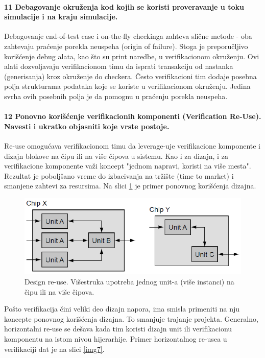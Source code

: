\documentclass[a4paper, 12pt]{article}
\begin{document}
\paragraph{11 Debagovanje okruženja kod kojih se koristi proveravanje u toku simulacije i na kraju simulacije.}
\hfill \break
\indent Debagovanje end-of-test case i on-the-fly checkinga zahteva slične metode - oba zahtevaju praćenje porekla neuspeha (origin of failure). Stoga je preporučljivo korišćenje debug alata, kao što su print naredbe, u verifikacionom okruženju. Ovi alati dozvoljavaju verifikacionom timu da isprati transakciju od nastanka (generisanja) kroz okruženje do checkera. Često verifikacioni tim dodaje posebna polja strukturama podataka koje se koriste u verifikacionom okruženju. Jedina svrha ovih posebnih polja je da pomognu u praćenju porekla neuspeha.
\paragraph{12 Ponovno korišćenje verifikacionih komponenti (Verification Re-Use). Navesti i ukratko objasniti koje vrste postoje.}
\hfill \break
\indent Re-use omogućava verifikacionom timu da leverage-uje verifikacione komponente i dizajn blokove na čipu ili na više čipova u sistemu. Kao i za dizajn, i za verifikacione komponente važi koncept "jednom napravi, koristi na više mesta". Rezultat je poboljšano vreme do izbacivanja na tržište (time to market) i smanjene zahtevi za resursima. Na slici \ref{img6} je primer ponovnog korišćenja dizajna.
\begin{figure}[h!]
\centering
\includegraphics[scale=0.5]{img6.png}
\caption{Design re-use. Višestruka upotreba jednog unit-a (više instanci) na čipu ili na više čipova.}
\label{img6}
\end{figure}
 \indent Pošto verifikacija čini veliki deo dizajn napora, ima smisla primeniti na nju koncepte ponovnog korišćenja dizajna. To smanjuje trajanje projekta. Generalno, horizontalni re-use se dešava kada tim koristi dizajn unit ili verifikacionu komponentu na istom nivou hijerarhije. Primer horizontalnog re-usea u verifikaciji dat je na slici \ref{img7}.
\end{document}
